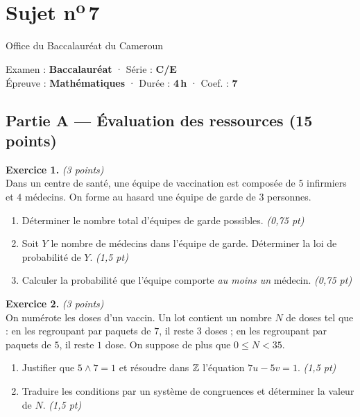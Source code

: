 \section{Sujet n\textsuperscript{o}\,7}
\noindent\begin{minipage}{0.5\linewidth}\footnotesize Office du Baccalauréat du Cameroun\end{minipage}%
\hfill\begin{minipage}{0.45\linewidth}\footnotesize\raggedleft Examen : \textbf{Baccalauréat} · Série : \textbf{C/E}\\
Épreuve : \textbf{Mathématiques} · Durée : \textbf{4\,h} · Coef. : \textbf{7}\end{minipage}
\par\smallskip{\color{onbo}\rule{\linewidth}{1pt}}

\subsection*{Partie A — Évaluation des ressources \hfill (15 points)}

\noindent\textbf{Exercice 1.} \hfill\textit{(3 points)}\\
Dans un centre de santé, une équipe de vaccination est composée de $5$ infirmiers et
$4$ médecins. On forme au hasard une équipe de garde de $3$ personnes.
\begin{enumerate}[label=\arabic*)]
\item Déterminer le nombre total d'équipes de garde possibles. \hfill\textit{(0,75 pt)}
\item Soit $Y$ le nombre de médecins dans l'équipe de garde. Déterminer la loi de
probabilité de $Y$. \hfill\textit{(1,5 pt)}
\item Calculer la probabilité que l'équipe comporte \emph{au moins un} médecin. \hfill\textit{(0,75 pt)}
\end{enumerate}

\smallskip
\noindent\textbf{Exercice 2.} \hfill\textit{(3 points)}\\
On numérote les doses d'un vaccin. Un lot contient un nombre $N$ de doses tel que :
en les regroupant par paquets de $7$, il reste $3$ doses ; en les regroupant par paquets
de $5$, il reste $1$ dose. On suppose de plus que $0\le N<35$.
\begin{enumerate}[label=\arabic*)]
\item Justifier que $5\wedge7=1$ et résoudre dans $\mathbb{Z}$ l'équation $7u-5v=1$. \hfill\textit{(1,5 pt)}
\item Traduire les conditions par un système de congruences et déterminer la valeur de $N$. \hfill\textit{(1,5 pt)}
\end{enumerate}

